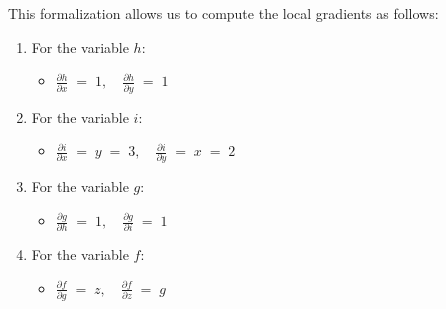 \documentclass[12pt]{report}
\begin{document}
\noindent This formalization allows us to compute the local gradients as follows:
\begin{enumerate}
    \item For the variable $h$:
        \begin{itemize}
            \item $\frac{\partial h}{\partial x} \;=\; 1,\quad \frac{\partial h}{\partial y} \;=\; 1$
        \end{itemize}

    \item For the variable $i$:
        \begin{itemize}
            \item $\frac{\partial i}{\partial x} \;=\; y \;=\; 3,\quad
                   \frac{\partial i}{\partial y} \;=\; x \;=\; 2$
        \end{itemize}

    \item For the variable $g$:
        \begin{itemize}
            \item $\frac{\partial g}{\partial h} \;=\; 1,\quad \frac{\partial g}{\partial i} \;=\; 1$
        \end{itemize}
    
        \item For the variable $f$:
        \begin{itemize}
            \item $\frac{\partial f}{\partial g} \;=\; z,\quad \frac{\partial f}{\partial z} \;=\; g$
        \end{itemize}
\end{enumerate} \clearpage
\end{document}

